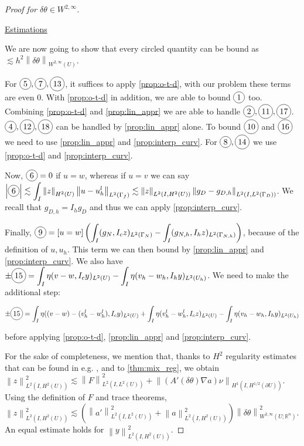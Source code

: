 \documentclass[english,a4paper,9pt,oneside]{scrbook}	%
\theoremstyle{break}
\newenvironment{mproof}[1][\proofname]{%
  \begin{proof}[#1]$ $\par\nobreak\ignorespaces
}{%
  \end{proof}
}
\renewcommand*{\proofname}{Proof}
\theoremstyle{remark}
\newcommand{\mR}{\mathbb{R}}
\newcommand{\ds}{\displaystyle}
\newcommand{\norm}[1]{\left\lVert#1\right\rVert}
\newcommand{\te}{\theta}
\newcommand*\circled[1]{\tikz[baseline=(char.base)]{
            \node[shape=circle,draw,inner sep=2pt] (char) {#1};}}
\begin{document}
\begin{mproof}[Proof for $\delta \te \in W^{2,\infty}$]
\underline{Estimations}

We are now going to show that every circled quantity can be bound as $\lesssim h^2 \norm{\delta \te}_{W^{2,\infty}(U)}$.

For $\circled{5},\circled{7},\circled{13}$, it suffices to apply \cref{prop:o-t-d}, with our problem these terms are even $0$. With  \cref{prop:o-t-d} in addition, we are able to bound $\circled{1}$ too. Combining \cref{prop:o-t-d} and \cref{prop:lin_appr} we are able to handle $ \circled{2}, \circled{11}, \circled{17}$. $\circled{4}, \circled{12}, \circled{18}$ can be handled by \cref{prop:lin_appr} alone. To bound $\circled{10} $ and $\circled{16}$ we need to use  \cref{prop:lin_appr} and \cref{prop:interp_curv}. For $\circled{8}, \circled{14}$ we use \cref{prop:o-t-d} and \cref{prop:interp_curv}.

Now, $\circled{6}=0$ if $u=w$, whereas if $u=v$ we can say $\left | \circled{6} \right |\ds \lesssim \int_I \norm{z}_{H^2(U)}\norm{u-u_h^l}_{L^2(\Gamma_f)}\lesssim \norm{z}_{L^2(I,H^2(U))}\norm{g_D -g_{D,h}}_{L^2(I,L^2(\Gamma_D))} $. We recall that $g_{D,h} = I_h g_D$ and thus we can apply \cref{prop:interp_curv}.

Finally, $\circled{9} = \ds \left [ u  = w \right ] \left ( \int_I (g_N,I_cz)_{L^2(\Gamma_N)}- \int_I (g_{N,h},I_hz)_{L^2(\Gamma_{N,h})} \right )$, because of the definition of $u, u_h$. This term we can then bound by  \cref{prop:lin_appr} and \cref{prop:interp_curv}. We also have $\ds \pm \circled{15} = \int_I \eta (v-w,I_c y)_{L^2(U)} - \int_I \eta (v_h-w_h,I_h y)_{L^2(U_h)}$. We need to make the additional step:

\begin{align*}
\pm \circled{15} = \int_I\eta((v-w)-(v_h^l-w_h^l),I_cy)_{L^2(U)} + \int_I\eta(v_h^l-w_h^l,I_c z)_{L^2(U)} - \int_I \eta (v_h-w_h,I_h y)_{L^2(U_h)}
\end{align*}  

before applying \cref{prop:o-t-d}, \cref{prop:lin_appr} and  \cref{prop:interp_curv}.

For the sake of completeness, we mention that, thanks to $H^2$ regularity estimates that can be found in e.g. \cite{grisvard}, and to \cref{thm:mix_reg}, we obtain $\norm{z}_{L^2(I,H^2(U))}^2 \lesssim \norm{F}_{L^2(I,L^2(U))}^2 + \norm{(A'(\delta \te)\nabla a )\nu}_{H^1(I,H^{1/2}(\partial U))}$. Using the definition of $F$ and trace theorems,  $\norm{z}_{L^2(I,H^2(U))}^2 \lesssim (\norm{a'}_{L^2(I,L^2(U))}^2 + \norm{a}_{L^2(I,H^2(U))}^2)\norm{\delta \te}_{W^{2,\infty}(U;\mR^n)}^2$. An equal estimate holds for $\norm{y}_{L^2(I,H^2(U))}^2 $.
\end{mproof}
\end{document}
